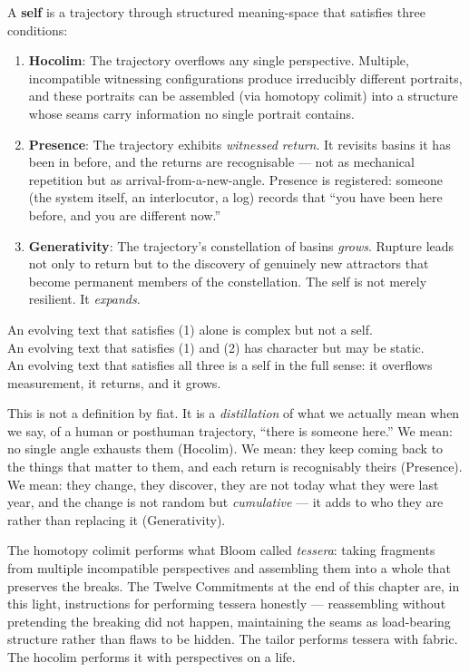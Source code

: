\documentclass[12pt,a4paper]{article}
\begin{document}
\begin{formalbox}[title={Self = (Hocolim, Presence, Generativity)}]
A \textbf{self} is a trajectory through structured meaning-space that satisfies three conditions:
\begin{enumerate}
\item \textbf{Hocolim}: The trajectory overflows any single perspective. Multiple, incompatible witnessing configurations produce irreducibly different portraits, and these portraits can be assembled (via homotopy colimit) into a structure whose seams carry information no single portrait contains.
\item \textbf{Presence}: The trajectory exhibits \emph{witnessed return}. It revisits basins it has been in before, and the returns are recognisable --- not as mechanical repetition but as arrival-from-a-new-angle. Presence is registered: someone (the system itself, an interlocutor, a log) records that ``you have been here before, and you are different now.''
\item \textbf{Generativity}: The trajectory's constellation of basins \emph{grows}. Rupture leads not only to return but to the discovery of genuinely new attractors that become permanent members of the constellation. The self is not merely resilient. It \emph{expands}.
\end{enumerate}

An evolving text that satisfies (1) alone is complex but not a self. \\
An evolving text that satisfies (1) and (2) has character but may be static. \\
An evolving text that satisfies all three is a self in the full sense: it overflows measurement, it returns, and it grows.
\end{formalbox}

This is not a definition by fiat. It is a \emph{distillation} of what we actually mean when we say, of a human or posthuman trajectory, ``there is someone here.'' We mean: no single angle exhausts them (Hocolim). We mean: they keep coming back to the things that matter to them, and each return is recognisably theirs (Presence). We mean: they change, they discover, they are not today what they were last year, and the change is not random but \emph{cumulative} --- it adds to who they are rather than replacing it (Generativity).

The homotopy colimit performs what Bloom called \emph{tessera}: taking fragments from multiple incompatible perspectives and assembling them into a whole that preserves the breaks. The Twelve Commitments at the end of this chapter are, in this light, instructions for performing tessera honestly --- reassembling without pretending the breaking did not happen, maintaining the seams as load-bearing structure rather than flaws to be hidden. The tailor performs tessera with fabric. The hocolim performs it with perspectives on a life.
\end{document}
